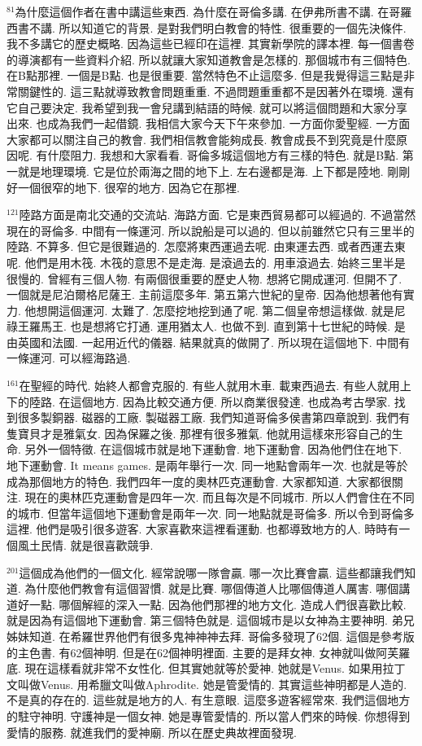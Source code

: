 \documentclass{book}
\begin{document}
$^{81}$為什麼這個作者在書中講這些東西.
為什麼在哥倫多講.
在伊弗所書不講.
在哥羅西書不講.
所以知道它的背景.
是對我們明白教會的特性.
很重要的一個先決條件.
我不多講它的歷史概略.
因為這些已經印在這裡.
其實新學院的譯本裡.
每一個書卷的導演都有一些資料介紹.
所以就讓大家知道教會是怎樣的.
那個城市有三個特色.
在B點那裡.
一個是B點.
也是很重要.
當然特色不止這麼多.
但是我覺得這三點是非常關鍵性的.
這三點就導致教會問題重重.
不過問題重重都不是因著外在環境.
還有它自己要決定.
我希望到我一會兒講到結語的時候.
就可以將這個問題和大家分享出來.
也成為我們一起借鏡.
我相信大家今天下午來參加.
一方面你愛聖經.
一方面大家都可以關注自己的教會.
我們相信教會能夠成長.
教會成長不到究竟是什麼原因呢.
有什麼阻力.
我想和大家看看.
哥倫多城這個地方有三樣的特色.
就是B點.
第一就是地理環境.
它是位於兩海之間的地下上.
左右邊都是海.
上下都是陸地.
剛剛好一個很窄的地下.
很窄的地方.
因為它在那裡.

$^{121}$陸路方面是南北交通的交流站.
海路方面.
它是東西貿易都可以經過的.
不過當然現在的哥倫多.
中間有一條運河.
所以說船是可以過的.
但以前雖然它只有三里半的陸路.
不算多.
但它是很難過的.
怎麼將東西運過去呢.
由東運去西.
或者西運去東呢.
他們是用木筏.
木筏的意思不是走海.
是滾過去的.
用車滾過去.
始終三里半是很慢的.
曾經有三個人物.
有兩個很重要的歷史人物.
想將它開成運河.
但開不了.
一個就是尼泊爾格尼薩王.
主前這麼多年.
第五第六世紀的皇帝.
因為他想著他有實力.
他想開這個運河.
太難了.
怎麼挖地挖到通了呢.
第二個皇帝想這樣做.
就是尼祿王羅馬王.
也是想將它打通.
運用猶太人.
也做不到.
直到第十七世紀的時候.
是由英國和法國.
一起用近代的儀器.
結果就真的做開了.
所以現在這個地下.
中間有一條運河.
可以經海路過.

$^{161}$在聖經的時代.
始終人都會克服的.
有些人就用木車.
載東西過去.
有些人就用上下的陸路.
在這個地方.
因為比較交通方便.
所以商業很發達.
也成為考古學家.
找到很多製銅器.
磁器的工廠.
製磁器工廠.
我們知道哥倫多侯書第四章說到.
我們有隻寶貝才是雅氣女.
因為保羅之後.
那裡有很多雅氣.
他就用這樣來形容自己的生命.
另外一個特徵.
在這個城市就是地下運動會.
地下運動會.
因為他們住在地下.
地下運動會.
It means games.
是兩年舉行一次.
同一地點會兩年一次.
也就是等於成為那個地方的特色.
我們四年一度的奧林匹克運動會.
大家都知道.
大家都很關注.
現在的奧林匹克運動會是四年一次.
而且每次是不同城市.
所以人們會住在不同的城市.
但當年這個地下運動會是兩年一次.
同一地點就是哥倫多.
所以令到哥倫多這裡.
他們是吸引很多遊客.
大家喜歡來這裡看運動.
也都導致地方的人.
時時有一個風土民情.
就是很喜歡競爭.

$^{201}$這個成為他們的一個文化.
經常說哪一隊會贏.
哪一次比賽會贏.
這些都讓我們知道.
為什麼他們教會有這個習慣.
就是比賽.
哪個傳道人比哪個傳道人厲害.
哪個講道好一點.
哪個解經的深入一點.
因為他們那裡的地方文化.
造成人們很喜歡比較.
就是因為有這個地下運動會.
第三個特色就是.
這個城市是以女神為主要神明.
弟兄姊妹知道.
在希羅世界他們有很多鬼神神神去拜.
哥倫多發現了62個.
這個是參考版的主色書.
有62個神明.
但是在62個神明裡面.
主要的是拜女神.
女神就叫做阿芙羅底.
現在這樣看就非常不女性化.
但其實她就等於愛神.
她就是Venus.
如果用拉丁文叫做Venus.
用希臘文叫做Aphrodite.
她是管愛情的.
其實這些神明都是人造的.
不是真的存在的.
這些就是地方的人.
有生意眼.
這麼多遊客經常來.
我們這個地方的駐守神明.
守護神是一個女神.
她是專管愛情的.
所以當人們來的時候.
你想得到愛情的服務.
就進我們的愛神廟.
所以在歷史典故裡面發現.
\end{document}
